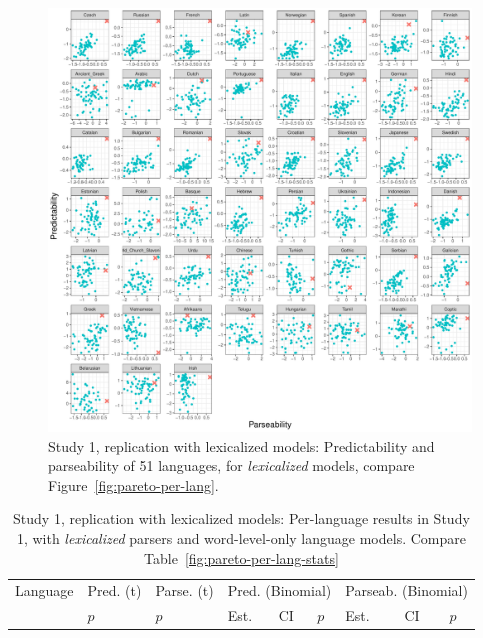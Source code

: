 \documentclass[10pt,twoside,lineno]{article}
\begin{document}
\begin{figure}
\centering
\includegraphics[width=\textwidth]{../results/plane/unlexicalized/pareto-plane-perLanguage-lexicalized.pdf}
	\caption[Predictability and Parseability]{Study 1, replication with lexicalized models: Predictability and parseability of 51 languages, for \emph{lexicalized} models, compare Figure~\ref{fig:pareto-per-lang}.}\label{fig:pareto-plane-noPOS}
\end{figure}


\begin{table}
\centering
\small{
\begin{tabular}{l||ll|lll|lll}
Language & Pred. (t) & Parse. (t) & \multicolumn{3}{c|}{Pred. (Binomial)} & \multicolumn{3}{c}{Parseab. (Binomial)} \\ 
&  $p$ & $p$ &  Est. &CI & $p$ & Est. & CI & $p$  \\ \hline \hline

\end{tabular}
}
	\caption{Study 1, replication with lexicalized models: Per-language results in Study 1, with \emph{lexicalized} parsers and word-level-only language models. Compare Table~\ref{fig:pareto-per-lang-stats}}\label{tab:pareto-plane-noPOS}
\end{table}
\end{document}
